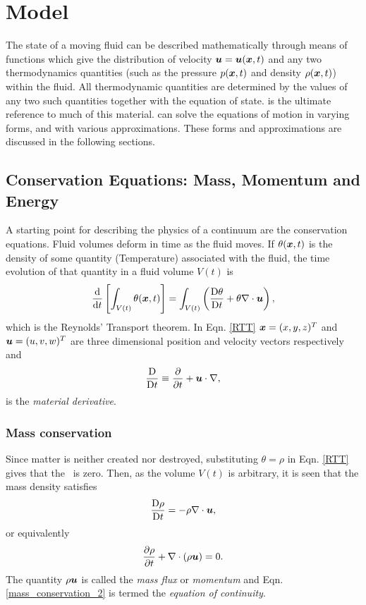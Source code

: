 \section{\fluidity Model}
\label{fluid_dynamics_section}

The state of a moving fluid can be described mathematically through means of functions which give the distribution of velocity ${\mbox{\boldmath$u$}}={\mbox{\boldmath$u$}}({\mbox{\boldmath$x$}},t)$ and any two thermodynamics quantities (such as the pressure $p({\mbox{\boldmath$x$}},t)$ and density $\rho({\mbox{\boldmath$x$}},t)$) within the fluid. All thermodynamic quantities are determined by the values of any two such quantities together with the equation of state. \citet{batchelor_1967} is the ultimate reference to much of this material. \fluidity can solve the equations of motion in varying forms, and with various approximations. These forms and approximations are discussed in the following sections.

\subsection{Conservation Equations: Mass, Momentum and Energy} 
A starting point for describing the physics of a continuum are the conservation equations. Fluid volumes deform in time as the fluid moves. If $\theta({\mbox{\boldmath$x$}},t)$ is the density of some quantity (\eg Temperature) associated with the fluid, the time evolution of that quantity in a fluid volume $V(t)$ is 
\begin{equation}\label{RTT}
 \frac{\mathrm{d}}{\mathrm{d} t}\left[\int_{V(t)}\theta({\mbox{\boldmath$x$}},t)\right]=
 \int_{V(t)}\left(\frac{\mathrm{D}\theta}{\mathrm{D} t}+\theta\nabla\cdot{\mbox{\boldmath$u$}}\right),
\end{equation}
\noindent
which is the Reynolds' Transport theorem. In Eqn. \ref{RTT} ${\mbox{\boldmath$x$}}=(x,y,z)^T$ and ${\mbox{\boldmath$u$}}=(u,v,w)^T$ are three dimensional position and velocity vectors respectively and 
\begin{equation}\label{MatDiv}
 \frac{\mathrm{D}}{\mathrm{D} t}\equiv\frac{\partial}{\partial{t}}+{\mbox{\boldmath$u$}}\cdot\nabla,
\end{equation}
is the \textit{material derivative}.

\subsubsection{Mass conservation}
Since matter is neither created nor destroyed, substituting $\theta=\rho$ in Eqn. \ref{RTT} gives that the \lhs\ is zero. Then, as the volume $V(t)$ is arbitrary, it is seen that the mass density satisfies
\begin{equation}\label{mass_conservation}
 \frac{\mathrm{D}\rho}{\mathrm{D} t}=-\rho\nabla\cdot{\mbox{\boldmath$u$}},
\end{equation}
or equivalently
\begin{equation}\label{mass_conservation_2}
 \frac{\partial\rho}{\partial{t}}+\nabla\cdot(\rho{\mbox{\boldmath$u$}})=0.
\end{equation}
The quantity $\rho{\mbox{\boldmath$u$}}$ is called the \textit{mass flux} or \textit{momentum} and Eqn. \ref{mass_conservation_2} is termed the \textit{equation of continuity}.

